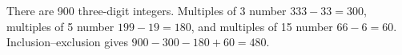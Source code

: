There are 900 three-digit integers. Multiples of 3 number $ 333-33=300 $, multiples of 5 number $ 199-19=180 $, and multiples of 15 number $ 66-6=60 $. Inclusion--exclusion gives $ 900-300-180+60=\boxed{480}$.
